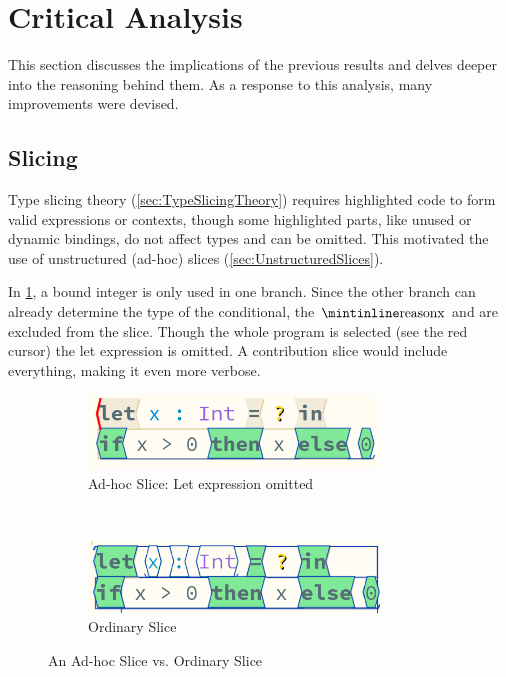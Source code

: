 \section{Critical Analysis}\label{sec:CriticalAnalysis}
This section discusses the implications of the previous results and delves deeper into the reasoning behind them. As a response to this analysis, many improvements were devised.
\subsection{Slicing}\label{sec:SlicingAnalysis}
Type slicing theory (\cref{sec:TypeSlicingTheory}) requires highlighted code to form valid expressions or contexts, though some highlighted parts, like unused or dynamic bindings, do not affect types and can be omitted. This motivated the use of unstructured (ad-hoc) slices (\cref{sec:UnstructuredSlices}).

In \cref{fig:LetSliceOmitted}, a bound integer  is only used in one branch. Since the other branch can already determine the type of the conditional, the $\code{x}$  and  are excluded from the slice. Though the whole program is selected (see the red cursor) the let expression is omitted. A contribution slice would include everything, making it even more verbose.
\begin{figure}
\centering
\begin{subfigure}{0.45\textwidth}
\centering

\includegraphics[width=0.85\textwidth]{Media/Figures/Unused_let}
\caption{Ad-hoc Slice: Let expression omitted}
\end{subfigure}$\qquad$
\begin{subfigure}{0.45\textwidth}
\centering

\includegraphics[width=0.85\textwidth]{Media/Figures/Unused_let_ordinary}
\caption{Ordinary Slice}
\end{subfigure}

\caption{An Ad-hoc Slice vs. Ordinary Slice}
\label{fig:LetSliceOmitted}
\end{figure}


